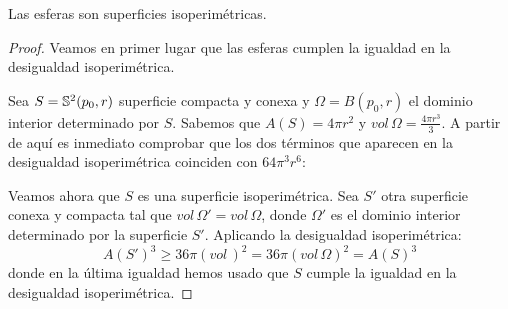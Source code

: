 \begin{proposition}\label{prop:spheresasisoperimetricsurfaces}
Las esferas son superficies isoperimétricas.
\end{proposition}
\begin{proof}
Veamos en primer lugar que las esferas cumplen la igualdad en la desigualdad isoperimétrica.

Sea $S=\mathbb{S}^2(p_0,r)$ superficie compacta y conexa y $\Omega = B(p_0,r)$ el dominio interior determinado por $S$. Sabemos que $A(S)=4\pi r^2$ y $vol \, \Omega = \frac{4\pi r^3}{3}$. A partir de aquí es inmediato comprobar que los dos términos que aparecen en la desigualdad isoperimétrica coinciden con $64\pi^3r^6$:

Veamos ahora que $S$ es una superficie isoperimétrica. Sea $S'$ otra superficie conexa y compacta tal que $vol \, \Omega' = vol \, \Omega$, donde $\Omega'$ es el dominio interior determinado por la superficie $S'$. Aplicando la desigualdad isoperimétrica:
%
\begin{equation*}
    A(S')^3 \geq 36\pi (vol \,)^2 = 36\pi (vol \, \Omega)^2 = A(S)^3 
\end{equation*}
%
donde en la última igualdad hemos usado que $S$ cumple la igualdad en la desigualdad isoperimétrica.
\end{proof}

